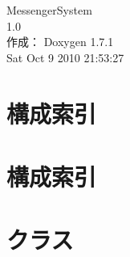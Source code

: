 \documentclass[a4paper]{book}
\begin{document}
\hypersetup{pageanchor=false}
\begin{titlepage}
\vspace*{7cm}
\begin{center}
{\Large MessengerSystem \\[1ex]\large 1.0 }\\
\vspace*{1cm}
{\large 作成： Doxygen 1.7.1}\\
\vspace*{0.5cm}
{\small Sat Oct 9 2010 21:53:27}\\
\end{center}
\end{titlepage}
\clearemptydoublepage
{}
\tableofcontents
\clearemptydoublepage
{}
\hypersetup{pageanchor=true}
\chapter{構成索引}

\chapter{構成索引}

\chapter{クラス}





\printindex
\end{document}
